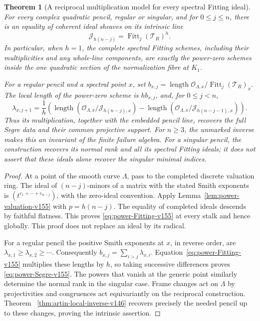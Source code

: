 \documentclass[11pt,reqno]{amsart}
\numberwithin{equation}{section}
\newtheorem{theorem}{Theorem}[section]
\theoremstyle{definition}\newtheorem{definition}[theorem]{Definition}
\theoremstyle{remark}\newtheorem{remark}[theorem]{Remark}
\newcommand{\OO}{\mathcal O}\newcommand{\II}{\mathcal I}
\DeclareMathOperator{\Fitt}{Fitt}\DeclareMathOperator{\Ann}{Ann}
\DeclareMathOperator{\length}{length}
\begin{document}
\begin{theorem}[A reciprocal multiplication model for every spectral Fitting ideal]
\label{thm:power-Fitting-v155}
For every complex quadratic pencil, regular or singular, and for
$0\leq j\leq n$, there is an equality of coherent ideal sheaves
on its intrinsic line
\begin{equation}\label{eq:power-Fitting-v155}
          \mathcal J_{h(n-j)}=\Fitt_j(\mathcal T_R)^h.
\end{equation}
In particular, when $h=1$, the complete spectral Fitting schemes,
including their multiplicities and any whole-line components, are
exactly the power-zero schemes inside the one quadratic section
of the normalization fibre at $K_1$.

For a regular pencil and a spectral point $x$, set
$b_{x,j}=\length\OO_{\Lambda,x}/\Fitt_j(\mathcal T_R)_x$.
The local length of the power-zero scheme is $h b_{x,j}$, and,
for $0\leq j<n$,
\begin{equation}\label{eq:power-Segre-v155}
 \lambda_{x,j+1}
   =\frac1h\left(\length(\OO_{\Lambda,x}/\mathcal J_{h(n-j),x})
           -\length(\OO_{\Lambda,x}/\mathcal J_{h(n-j-1),x})\right).
\end{equation}
Thus its multiplication, together with the embedded pencil line,
recovers the full Segre data and their common projective support.
For $n\geq3$, the unmarked inverse makes this an invariant of the
finite failure algebra.  For a singular pencil, the construction recovers its
normal rank and all its spectral Fitting ideals; it does not assert
that these ideals alone recover the singular minimal indices.
\end{theorem}
\begin{proof}
At a point of the smooth curve $\Lambda$, pass to the completed
discrete valuation ring.  The ideal of $(n-j)$-minors of a matrix
with the stated Smith exponents is
$(t^{e_1+\cdots+e_{n-j}})$, with the zero-ideal convention.
Apply Lemma~\ref{lem:power-valuation-v155} with $p=h(n-j)$.
The equality of completed ideals descends by faithful flatness.
This proves \eqref{eq:power-Fitting-v155} at every stalk and hence
globally.  This proof does not replace an ideal by its radical.

For a regular pencil the positive Smith exponents at $x$, in
reverse order, are $\lambda_{x,1}\geq\lambda_{x,2}\geq\cdots$.
Consequently $b_{x,j}=\sum_{i>j}\lambda_{x,i}$.
Equation~\eqref{eq:power-Fitting-v155} multiplies these lengths by
$h$, so taking successive differences proves
\eqref{eq:power-Segre-v155}.  The powers that vanish at the generic
point similarly determine the normal rank in the singular case.
Frame changes act on $\Lambda$ by projectivities and congruences
act equivariantly on the reciprocal construction.  Theorem~
\ref{thm:artin-local-inverse-v146} recovers precisely the needed
pencil up to these changes, proving the intrinsic assertion.
\end{proof}
\end{document}

